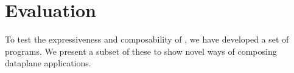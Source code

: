 \documentclass[letterpaper,twocolumn,10pt]{article}
\begin{document}





\section{Evaluation}
\label{sec:evaluation}
To test the expressiveness and composability of \ulang, we have
developed a set of \ulang programs. We present a subset of
these to show novel ways of composing dataplane applications.
\end{document}
